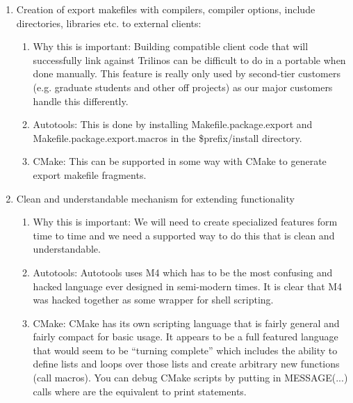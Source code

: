\documentclass[pdf,ps2pdf,11pt]{SANDreport}
\begin{document}
\begin{enumerate}
\begin{enumerate}
  \end{enumerate}

{}\item Creation of export makefiles with compilers, compiler
options, include directories, libraries etc. to external clients:

  \begin{enumerate}

  {}\item Why this is important: Building compatible client code
  that will successfully link against Trilinos can be difficult to
  do in a portable when done manually.  This feature is really only used
  by second-tier customers (e.g. graduate students and other off
  projects) as our major customers handle this differently.

  {}\item Autotools: This is done by installing
  Makefile.package.export and Makefile.package.export.macros in the
  \$prefix/install directory.

  {}\item CMake: This can be supported in some way with CMake to
  generate export makefile fragments.

  \end{enumerate}

{}\item Clean and understandable mechanism for extending
functionality

  \begin{enumerate}

  {}\item Why this is important: We will need to create specialized
  features form time to time and we need a supported way to do this
  that is clean and understandable.

  {}\item Autotools: Autotools uses M4 which has to be the most
  confusing and hacked language ever designed in semi-modern times.
  It is clear that M4 was hacked together as some wrapper for shell
  scripting.

  {}\item CMake: CMake has its own scripting language that is fairly
  general and fairly compact for basic usage.  It appears to be a full
  featured language that would seem to be ``turning complete'' which
  includes the ability to define lists and loops over those lists and
  create arbitrary new functions (call macros).  You can debug CMake
  scripts by putting in MESSAGE(...) calls where are the equivalent to
  print statements.


\end{enumerate}
\end{enumerate}
\end{document}
